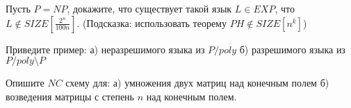 \begin{ptask}{19}
    Пусть $P = NP$, докажите, что существует такой язык $L \in EXP$, что
    $L \notin SIZE[\frac{2^n}{100n}]$. (Подсказка: использовать теорему $PH \notin SIZE[n^k]$)
\end{ptask}

\begin{ptask}{20}
    Приведите пример:
    а) неразрешимого языка из $P/poly$
    б) разрешимого языка из $P/poly \setminus P$
\end{ptask}

\begin{ptask}{21}
	Опишите $NC$ схему для:
    а) умножения двух матриц над конечным полем
    б) возведения матрицы с степень $n$ над конечным полем.
\end{ptask}